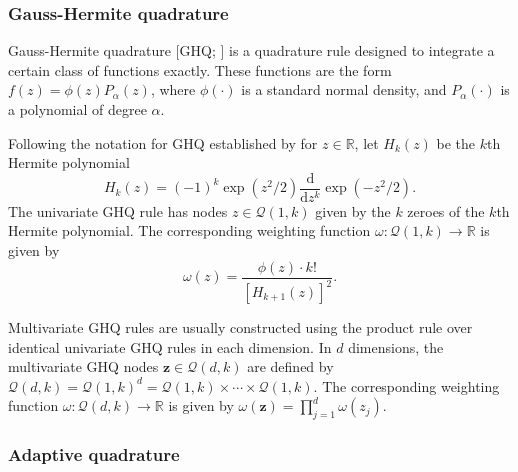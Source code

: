 \documentclass[a4paper, nobind]{templates/ociamthesis}
\begin{document}
\hypertarget{gauss-hermite-quadrature}{%
\subsubsection{Gauss-Hermite quadrature}\label{gauss-hermite-quadrature}}

Gauss-Hermite quadrature {[}GHQ; \textcite{davis1975methods}{]} is a quadrature rule designed to integrate a certain class of functions exactly.
These functions are the form \(f(z) = \phi(z) P_\alpha(z)\), where \(\phi(\cdot)\) is a standard normal density, and \(P_\alpha(\cdot)\) is a polynomial of degree \(\alpha\).

Following the notation for GHQ established by \textcite{bilodeau2022stochastic} for \(z \in \mathbb{R}\), let \(H_k(z)\) be the \(k\)th Hermite polynomial
\begin{equation}
H_k(z) = (-1)^k \exp(z^2 / 2) \frac{\text{d}}{\text{d}z^k} \exp(-z^2 / 2).
\end{equation}
The univariate GHQ rule has nodes \(z \in \mathcal{Q}(1, k)\) given by the \(k\) zeroes of the \(k\)th Hermite polynomial.
The corresponding weighting function \(\omega: \mathcal{Q}(1, k) \to \mathbb{R}\) is given by
\begin{equation}
\omega(z) = \frac{\phi(z) \cdot k!}{[H_{k + 1}(z)]^2}.
\end{equation}

Multivariate GHQ rules are usually constructed using the product rule over identical univariate GHQ rules in each dimension.
In \(d\) dimensions, the multivariate GHQ nodes \(\mathbf{z} \in \mathcal{Q}(d, k)\) are defined by \(\mathcal{Q}(d, k) = \mathcal{Q}(1, k)^d = \mathcal{Q}(1, k) \times \cdots \times \mathcal{Q}(1, k)\).
The corresponding weighting function \(\omega: \mathcal{Q}(d, k) \to \mathbb{R}\) is given by \(\omega(\mathbf{z}) = \prod_{j = 1}^d \omega(z_j)\).

\hypertarget{adaptive-quadrature}{%
\subsubsection{Adaptive quadrature}\label{adaptive-quadrature}}
\end{document}
